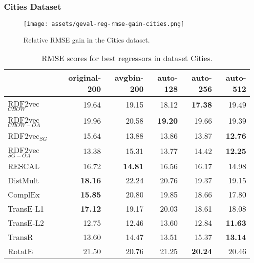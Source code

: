 \documentclass[11pt,titlepage,oneside,openany]{book}
\begin{document}
\newpage

\subsubsection{Cities Dataset}
\label{subsubsec:geval-results-reg-cities}


\begin{figure}[H]
    \centering
    \texttt{[image: assets/geval-reg-rmse-gain-cities.png]}
    \vspace*{-3mm}
    \caption{Relative RMSE gain in the Cities dataset.}
    \label{fig:geval-reg-rmse-gain-cities}
\end{figure}


\begin{table}[H]
\centering
\begin{tabular}{lrrrrr}
\toprule
{} &  original-200 &  avgbin-200 &  auto-128 &  auto-256 &  auto-512 \\
\midrule
RDF2vec$_{CBOW}$     &         19.64  &       19.15  &     18.12  &	\textbf{17.38} &     19.49  \\
RDF2vec$_{CBOW-OA}$  &         19.96  &       20.58  &	\textbf{19.20} &     19.66  &     19.39  \\
RDF2vec$_{SG}$       &         15.64  &       13.88  &     13.86  &     13.87  &	\textbf{12.76} \\
RDF2vec$_{SG-OA}$    &         13.38  &       15.31  &     13.77  &     14.42  &	\textbf{12.25} \\
RESCAL               &         16.72  &	\textbf{14.81} &     16.56  &     16.17  &     14.98  \\
DistMult             &	\textbf{18.16} &       22.24  &     20.76  &     19.37  &     19.15  \\
ComplEx              &	\textbf{15.85} &       20.80  &     19.85  &     18.66  &     17.80  \\
TransE-L1            &	\textbf{17.12} &       19.17  &     20.03  &     18.61  &     18.08  \\
TransE-L2            &         12.75  &       12.46  &     13.60  &     12.84  &	\textbf{11.63} \\
TransR               &         13.60  &       14.47  &     13.51  &     15.37  &	\textbf{13.14} \\
RotatE               &         21.50  &       20.76  &     21.25  &	\textbf{20.24} &     20.46  \\
\bottomrule
\end{tabular}
\caption{RMSE scores for best regressors in dataset Cities.}
\label{tab:geval-reg-rmse-cities}
\end{table}
\end{document}
